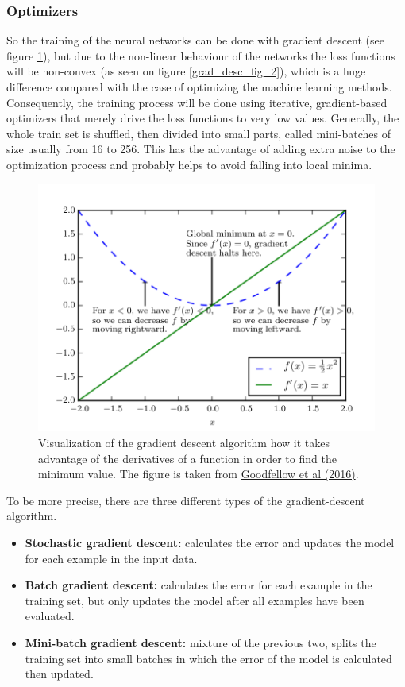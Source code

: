 \documentclass[12pt]{article}
\theoremstyle{plain}
\begin{document}
\subsubsection{Optimizers}

So the training of the neural networks can be done with gradient descent (see figure \ref{grad_desc_fig_1}), but due to the non-linear behaviour of the networks the loss functions will be non-convex (as seen on figure \ref{grad_desc_fig_2}), which is a huge difference compared with the case of optimizing the machine learning methods. Consequently, the training process will be done using iterative, gradient-based optimizers that merely drive the loss functions to very low values. Generally, the whole train set is shuffled, then divided into small parts, called mini-batches of size usually from 16 to 256. This has the advantage of adding extra noise to the optimization process and probably helps to avoid falling into local minima. 

\begin{figure}[h!]
    \centering
	\includegraphics[width=.7\linewidth]{media/grad_desc_fig1.png}
	\caption{Visualization of the gradient descent algorithm how it takes advantage of the derivatives of a function in order to find the minimum value. The figure is taken from \protect\hyperlink{Deeplea_Goodfellow}{Goodfellow et al (2016)}.}
	\label{grad_desc_fig_1}
\end{figure}

To be more precise, there are three different types of the gradient-descent algorithm.

\begin{itemize}
	\item \textbf{Stochastic gradient descent:} calculates the error and updates the model for each example in the input data.
	\item \textbf{Batch gradient descent:} calculates the error for each example in the training set, but only updates the model after all examples have been evaluated.
	\item \textbf{Mini-batch gradient descent:} mixture of the previous two, splits the training set into small batches in which the error of the model is calculated then updated.
\end{itemize}
\end{document}
